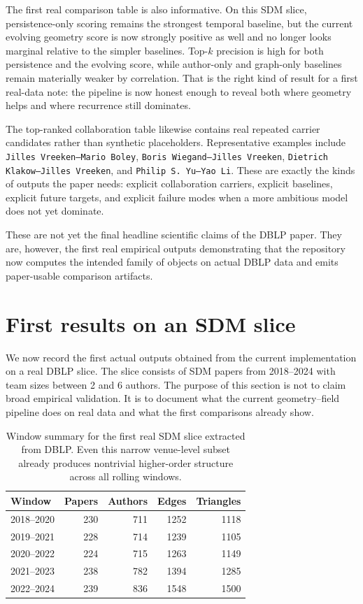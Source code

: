 \documentclass[11pt]{article}
\begin{document}
The first real comparison table is also informative. On this SDM slice, persistence-only scoring remains the strongest temporal baseline, but the current evolving geometry score is now strongly positive as well and no longer looks marginal relative to the simpler baselines. Top-$k$ precision is high for both persistence and the evolving score, while author-only and graph-only baselines remain materially weaker by correlation. That is the right kind of result for a first real-data note: the pipeline is now honest enough to reveal both where geometry helps and where recurrence still dominates.

The top-ranked collaboration table likewise contains real repeated carrier candidates rather than synthetic placeholders. Representative examples include \texttt{Jilles Vreeken--Mario Boley}, \texttt{Boris Wiegand--Jilles Vreeken}, \texttt{Dietrich Klakow--Jilles Vreeken}, and \texttt{Philip S. Yu--Yao Li}. These are exactly the kinds of outputs the paper needs: explicit collaboration carriers, explicit baselines, explicit future targets, and explicit failure modes when a more ambitious model does not yet dominate.

These are not yet the final headline scientific claims of the DBLP paper. They are, however, the first real empirical outputs demonstrating that the repository now computes the intended family of objects on actual DBLP data and emits paper-usable comparison artifacts.

\section{First results on an SDM slice}
We now record the first actual outputs obtained from the current implementation on a real DBLP slice. The slice consists of SDM papers from 2018--2024 with team sizes between 2 and 6 authors. The purpose of this section is not to claim broad empirical validation. It is to document what the current geometry--field pipeline does on real data and what the first comparisons already show.

\begin{table}[t]
\centering
\begin{tabular}{lrrrr}
\toprule
Window & Papers & Authors & Edges & Triangles \\
\midrule
2018--2020 & 230 & 711 & 1252 & 1118 \\
2019--2021 & 228 & 714 & 1239 & 1105 \\
2020--2022 & 224 & 715 & 1263 & 1149 \\
2021--2023 & 238 & 782 & 1394 & 1285 \\
2022--2024 & 239 & 836 & 1548 & 1500 \\
\bottomrule
\end{tabular}
\caption{Window summary for the first real SDM slice extracted from DBLP. Even this narrow venue-level subset already produces nontrivial higher-order structure across all rolling windows.}
\label{tab:sdm-window-summary}
\end{table}
\end{document}
